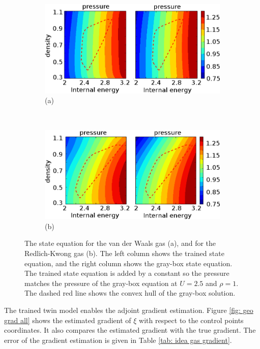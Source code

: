 \begin{figure}[htbp]\begin{center}
    \begin{subfigure}[t]{.99\textwidth}
        \centering
        \includegraphics[height=5.cm]{../state_eqn_vdw.png}
        \caption{(a)}
        \label{fig: graysol Ubend}
    \end{subfigure}\\
    \begin{subfigure}[t]{.99\textwidth}
        \centering
        \includegraphics[height=5.cm]{../state_eqn_rk.png}
        \caption{(b)}
        \label{fig: errsol Ubend}
    \end{subfigure}
    \caption{The state equation for the van der Waals gas (a), and for the
             Redlich-Kwong gas (b).
             The left column shows the trained state equation, and the right
             column shows the gray-box state equation. The trained state equation
             is added by a constant so the pressure matches the pressure of the
             gray-box equation at $U=2.5$ and $\rho=1$. The dashed red line shows
             the convex hull of the gray-box solution.}
    \label{fig: state err Ubend}
\end{center}\end{figure}


The trained twin model enables the adjoint gradient estimation.
Figure \ref{fig: geo grad all} shows the
estimated gradient of $\xi$ with respect to the control points coordinates. It also
compares the estimated gradient with the true gradient. 
The error of the gradient estimation is given in Table \ref{tab: idea gas gradient}.

